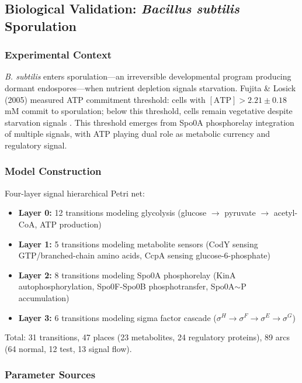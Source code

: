 \documentclass[10pt,letterpaper]{article}
\begin{document}
\subsection{Biological Validation: \textit{Bacillus subtilis} Sporulation}

\subsubsection{Experimental Context}

\textit{B. subtilis} enters sporulation---an irreversible developmental program producing dormant endospores---when nutrient depletion signals starvation. Fujita \& Losick (2005) measured ATP commitment threshold: cells with $[\text{ATP}] > 2.21 \pm 0.18$ mM commit to sporulation; below this threshold, cells remain vegetative despite starvation signals \cite{fujita2005}. This threshold emerges from Spo0A phosphorelay integration of multiple signals, with ATP playing dual role as metabolic currency and regulatory signal.

\subsubsection{Model Construction}

Four-layer signal hierarchical Petri net:
\begin{itemize}
\item \textbf{Layer 0:} 12 transitions modeling glycolysis (glucose $\rightarrow$ pyruvate $\rightarrow$ acetyl-CoA, ATP production)
\item \textbf{Layer 1:} 5 transitions modeling metabolite sensors (CodY sensing GTP/branched-chain amino acids, CcpA sensing glucose-6-phosphate)
\item \textbf{Layer 2:} 8 transitions modeling Spo0A phosphorelay (KinA autophosphorylation, Spo0F-Spo0B phosphotransfer, Spo0A$\sim$P accumulation)
\item \textbf{Layer 3:} 6 transitions modeling sigma factor cascade ($\sigma^H \rightarrow \sigma^F \rightarrow \sigma^E \rightarrow \sigma^G$)
\end{itemize}

Total: 31 transitions, 47 places (23 metabolites, 24 regulatory proteins), 89 arcs (64 normal, 12 test, 13 signal flow).

\subsubsection{Parameter Sources}
\end{document}

